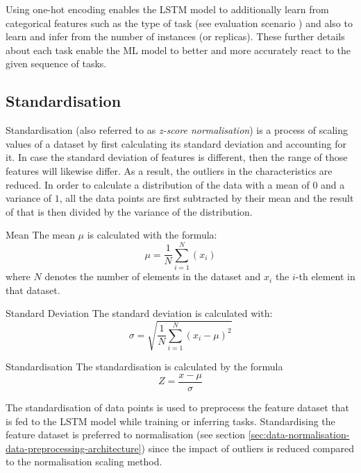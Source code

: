   Using one-hot encoding enables the LSTM model to additionally learn from categorical features such as the type of task (see evaluation scenario ) and also to learn and infer from the number of instances (or  replicas). 
  These further details about each task enable the ML model to better and more accurately react to the given sequence of tasks.

  \subsection{Standardisation}
  \label{sec:data-standardisation-data-preprocessing-architecture}
    Standardisation (also referred to as \emph{z-score normalisation}) is a process of scaling values of a dataset by first calculating its standard deviation and accounting for it. In case the standard deviation of features is different, then the range of those features will likewise differ. As a result, the outliers in the characteristics are reduced.
    In order to calculate a distribution of the data with a mean of $0$ and a variance of $1$, all the data points are first subtracted by their mean and the result of that is then divided by the variance of the distribution.

    \begin{pabox}{Mean}
      \label{def:mean}
      The mean $\mu$ is calculated with the formula:
      $$\mu = \frac{1}{N}\sum_{i = 1}^{N}\left(x_i\right)$$
      where $N$ denotes the number of elements in the dataset and $x_i$ the $i$-th element in that dataset.
    \end{pabox}

    \begin{pabox}{Standard Deviation}
    \label{def:standard-deviation}
      The standard deviation is calculated with:
      $$\sigma = \sqrt{\frac{1}{N} \sum_{i = 1}^{N}\left(x_i - \mu\right)^2}$$
    \end{pabox}

    \begin{pabox}{Standardisation}
    \label{def:standardisation}
      The standardisation is calculated by the formula $$Z = \frac{x - \mu}{\sigma}$$
    \end{pabox}

    The standardisation of data points is used to preprocess the feature dataset that is fed to the LSTM model while training or inferring tasks. Standardising the feature dataset is preferred to normalisation (see section \ref{sec:data-normalisation-data-preprocessing-architecture}) since the impact of outliers is reduced compared to the normalisation scaling method.

